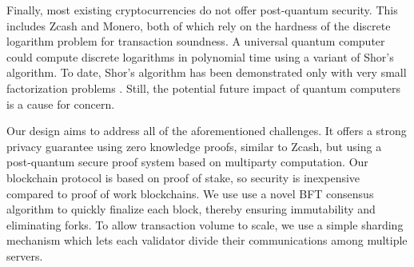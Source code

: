 Finally, most existing cryptocurrencies do not offer post-quantum security. This includes Zcash and Monero, both of which rely on the hardness of the discrete logarithm problem for transaction soundness. A universal quantum computer could compute discrete logarithms in polynomial time using a variant of Shor's algorithm. To date, Shor's algorithm has been demonstrated only with very small factorization problems \cite{martin2012experimental}. Still, the potential future impact of quantum computers is a cause for concern.

Our design aims to address all of the aforementioned challenges. It offers a strong privacy guarantee using zero knowledge proofs, similar to Zcash, but using a post-quantum secure proof system based on multiparty computation. Our blockchain protocol is based on proof of stake, so security is inexpensive compared to proof of work blockchains. We use use a novel BFT consensus algorithm to quickly finalize each block, thereby ensuring immutability and eliminating forks. To allow transaction volume to scale, we use a simple sharding mechanism which lets each validator divide their communications among multiple servers.
